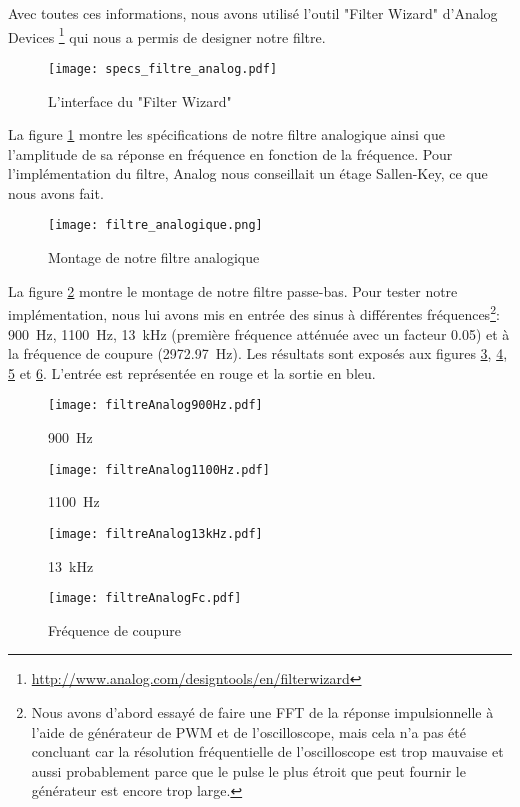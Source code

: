 Avec toutes ces informations, nous avons utilisé l'outil "Filter Wizard" d'Analog Devices \footnote{\url{http://www.analog.com/designtools/en/filterwizard}} qui nous a permis de designer notre filtre.
\begin{figure}[htbp]
\centering
\texttt{[image: specs\_filtre\_analog.pdf]}
\caption{L'interface du "Filter Wizard"}
\label{fig:specsAnalogFilter}
\end{figure}
La figure \ref{fig:specsAnalogFilter} montre les spécifications de notre filtre analogique ainsi que l'amplitude de sa réponse en fréquence en fonction de la fréquence. Pour l'implémentation du filtre, Analog nous conseillait un étage Sallen-Key, ce que nous avons fait.
\begin{figure}[htbp]
\centering
\texttt{[image: filtre\_analogique.png]}
\caption{Montage de notre filtre analogique}
\label{fig:filtreAnalogique}
\end{figure}
La figure \ref{fig:filtreAnalogique} montre le montage de notre filtre passe-bas. Pour tester notre implémentation, nous lui avons mis en entrée des sinus à différentes fréquences\footnote{Nous avons d'abord essayé de faire une FFT de la réponse impulsionnelle à l'aide de générateur de PWM et de l'oscilloscope, mais cela n'a pas été concluant car la résolution fréquentielle de l'oscilloscope est trop mauvaise et aussi probablement parce que le pulse le plus étroit que peut fournir le générateur est encore trop large.}: \SI{900}{\hertz}, \SI{1100}{\hertz}, \SI{13}{\kilo\hertz} (première fréquence atténuée avec un facteur 0.05) et à la fréquence de coupure (\SI{2972.97}{\hertz}). Les résultats sont exposés aux figures \ref{fig:filtreAnalog900Hz}, \ref{fig:filtreAnalog1100Hz}, \ref{fig:filtreAnalog13kHz} et \ref{fig:filtreAnalogFc}. L'entrée est représentée en rouge et la sortie en bleu.
\begin{figure}[htbp]
\centering
\texttt{[image: filtreAnalog900Hz.pdf]}
\caption{\SI{900}{\hertz}}
\label{fig:filtreAnalog900Hz}
\end{figure}
\begin{figure}[htbp]
\centering
\texttt{[image: filtreAnalog1100Hz.pdf]}
\caption{\SI{1100}{\hertz}}
\label{fig:filtreAnalog1100Hz}
\end{figure}
\begin{figure}[htbp]
\centering
\texttt{[image: filtreAnalog13kHz.pdf]}
\caption{\SI{13}{\kilo\hertz}}
\label{fig:filtreAnalog13kHz}
\end{figure}
\begin{figure}[htbp]
\centering
\texttt{[image: filtreAnalogFc.pdf]}
\caption{Fréquence de coupure}
\label{fig:filtreAnalogFc}
\end{figure}

